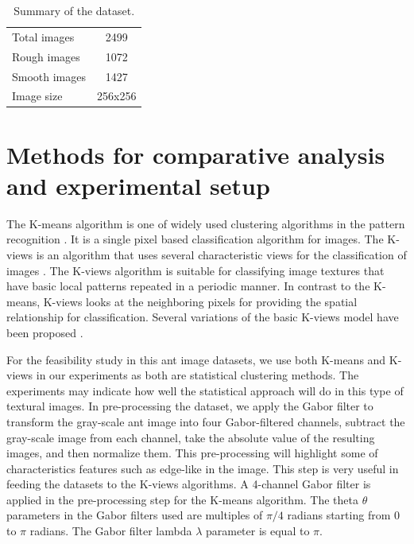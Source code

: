 \documentclass{aci}
\numberwithin{equation}{section}
\begin{document}
\begin{table}[h]
    \centering
    \caption{Summary of the dataset.}
    \begin{tabular}{|l|c|}
        \toprule
        Total images  & 2499    \\
        Rough images  & 1072    \\
        Smooth images & 1427    \\
        Image size    & 256x256 \\
        \bottomrule
    \end{tabular}
    \label{tab:dataset-summary}
\end{table}

\section{Methods for comparative analysis and experimental setup}


The K-means algorithm is one of widely used clustering algorithms in the pattern
recognition \cite{lloyd_least_1982}. It is a single pixel based classification
algorithm for images. The K-views is an algorithm that uses several
characteristic views for the classification of images \cite{hung_use_2002}. The
K-views algorithm is suitable for classifying image textures that have basic
local patterns repeated in a periodic manner. In contrast to the K-means,
K-views looks at the neighboring pixels for providing the spatial relationship
for classification.  Several variations of the basic K-views model have been
proposed \cite{yang_image_2003, lan_improved_2010}.

For the feasibility study in this ant image datasets, we use both K-means and
K-views in our experiments as both are statistical clustering methods. The
experiments may indicate how well the statistical approach will do in this type
of textural images. In pre-processing the dataset, we apply the Gabor filter to
transform the gray-scale ant image into four Gabor-filtered channels, subtract
the gray-scale image from each channel, take the absolute value of the resulting
images, and then normalize them. This pre-processing will highlight some of
characteristics features such as edge-like in the image. This step is very
useful in feeding the datasets to the K-views algorithms. A 4-channel Gabor
filter is applied in the pre-processing step for the K-means algorithm. The
theta $\theta$ parameters in the Gabor filters used are multiples of $\pi/4$
radians starting from $0$ to $\pi$ radians. The Gabor filter lambda $\lambda$
parameter is equal to $\pi$.
\end{document}
